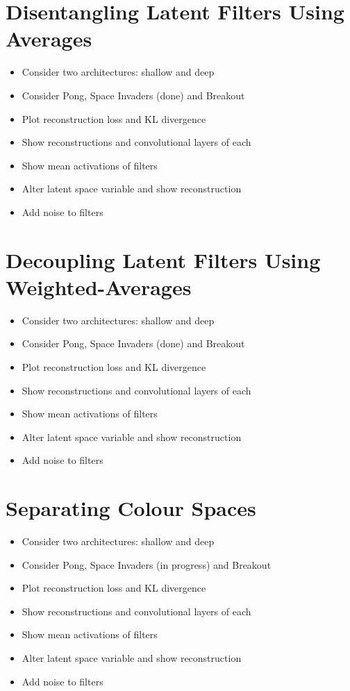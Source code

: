 %
%
%
%
%
\section{Disentangling Latent Filters Using Averages}
\begin{itemize}
\item Consider two architectures: shallow and deep
\item Consider Pong, Space Invaders (done) and Breakout
\item Plot reconstruction loss and KL divergence
\item Show reconstructions and convolutional layers of each
\item Show mean activations of filters
\item Alter latent space variable and show reconstruction
\item Add noise to filters
\end{itemize}


%
%
%
%
%
\section{Decoupling Latent Filters Using Weighted-Averages}
\begin{itemize}
\item Consider two architectures: shallow and deep
\item Consider Pong, Space Invaders (done) and Breakout
\item Plot reconstruction loss and KL divergence
\item Show reconstructions and convolutional layers of each
\item Show mean activations of filters
\item Alter latent space variable and show reconstruction
\item Add noise to filters
\end{itemize}


%
%
%
%
%
\section{Separating Colour Spaces}
\begin{itemize}
\item Consider two architectures: shallow and deep
\item Consider Pong, Space Invaders (in progress) and Breakout
\item Plot reconstruction loss and KL divergence
\item Show reconstructions and convolutional layers of each
\item Show mean activations of filters
\item Alter latent space variable and show reconstruction
\item Add noise to filters
\end{itemize}


